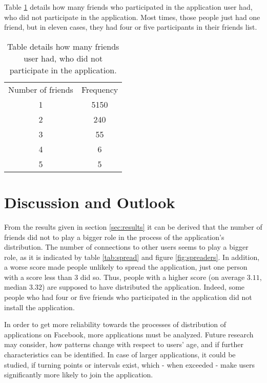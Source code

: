 \documentclass[preprint,12pt]{elsarticle}
\begin{document}
Table \ref{tab:nouser} details how many friends who participated in
the application user had, who did not participate in the
application. Most times, those people just had one friend, but in eleven
cases, they had four or five participants in their friends list.

\begin{table}
\label{tab:nouser}
\begin{tabular}{c c}
Number of friends & Frequency \\
1& 5150\\
2& 240\\
3& 55\\
4& 6\\
5& 5\\
\end{tabular}
\caption{Table details how many friends user had, who did not
  participate in the application.}
\end{table}







\section{Discussion and Outlook}
\label{sec:discussion}
From the results given in section \ref{sec:results} it can be derived
that the number of friends did not to play a bigger role in the
process of the application's distribution. The number of connections
to other users seems to play a bigger 
role, as it is indicated by table \ref{tab:spread} and figure
\ref{fig:spreaders}. In addition, a worse score made people unlikely
to spread the application, just one person with a score less than 3
did so. Thus, people with a higher score (on average $3.11$, median $3.32$) are
supposed to have distributed the application. Indeed, some people who
had four or five friends who participated in the application did not
install the application.

In order to get more reliability towards the processes of distribution
of applications on Facebook, more applications must be analyzed.
Future research may consider, how patterns change with respect
to users' age, and if further characteristics can be identified. In
case of larger applications, it could be studied, if turning points
or intervals exist, which - when exceeded - make users significantly
more likely to join the application.
\end{document}
